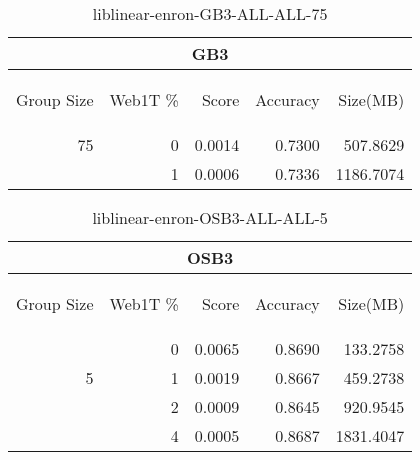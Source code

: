 \begin{center}
\begin{table}[htbp] 
 \begin{center}
\begin{tabular}{ | r | r | r | r | r |}
\hline
\multicolumn{5}{|c|}{GB3}\\
\hline
\begin{sideways}Group Size\end{sideways} & \begin{sideways}Web1T \%\end{sideways} & \begin{sideways}Score\end{sideways} & \begin{sideways}Accuracy\end{sideways} & \begin{sideways}Size(MB)\end{sideways}\\
\hline
\multirow{1}{*}{75}
 & 0 & 0.0014 & 0.7300 & 507.8629\\ \cline{2-5}
 & 1 & 0.0006 & 0.7336 & 1186.7074\\ \cline{2-5}
\hline
\end{tabular}
\caption{liblinear-enron-GB3-ALL-ALL-75}
\label{table:liblinear-enron-GB3-ALL-ALL-75}
\end{center}
 \end{table}
\end{center}

\begin{center}
\begin{table}[htbp] 
 \begin{center}
\begin{tabular}{ | r | r | r | r | r |}
\hline
\multicolumn{5}{|c|}{OSB3}\\
\hline
\begin{sideways}Group Size\end{sideways} & \begin{sideways}Web1T \%\end{sideways} & \begin{sideways}Score\end{sideways} & \begin{sideways}Accuracy\end{sideways} & \begin{sideways}Size(MB)\end{sideways}\\
\hline
\multirow{3}{*}{5}
 & 0 & 0.0065 & 0.8690 & 133.2758\\ \cline{2-5}
 & 1 & 0.0019 & 0.8667 & 459.2738\\ \cline{2-5}
 & 2 & 0.0009 & 0.8645 & 920.9545\\ \cline{2-5}
 & 4 & 0.0005 & 0.8687 & 1831.4047\\ \cline{2-5}
\hline
\end{tabular}
\caption{liblinear-enron-OSB3-ALL-ALL-5}
\label{table:liblinear-enron-OSB3-ALL-ALL-5}
\end{center}
 \end{table}
\end{center}

